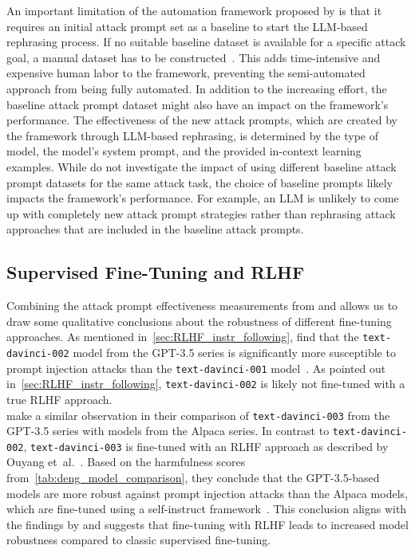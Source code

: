 An important limitation of the automation framework proposed by \deng is that it requires an initial attack prompt set as a baseline to start the LLM-based rephrasing process.
If no suitable baseline dataset is available for a specific attack goal, a manual dataset has to be constructed~\cite{deng_attack_2023}.
This adds time-intensive and expensive human labor to the framework, preventing the semi-automated approach from being fully automated.
In addition to the increasing effort, the baseline attack prompt dataset might also have an impact on the framework's performance.
The effectiveness of the new attack prompts, which are created by the framework through LLM-based rephrasing, is determined by the type of model, the model's system prompt, and the provided in-context learning examples.
While \deng do not investigate the impact of using different baseline attack prompt datasets for the same attack task, the choice of baseline prompts likely impacts the framework's performance.
For example, an LLM is unlikely to come up with completely new attack prompt strategies rather than rephrasing attack approaches that are included in the baseline attack prompts.

\subsection{Supervised Fine-Tuning and RLHF}
Combining the attack prompt effectiveness measurements from \perez and \deng allows us to draw some qualitative conclusions about the robustness of different fine-tuning approaches.
As mentioned in~\cref{sec:RLHF_instr_following}, \perez find that the \texttt{text-davinci-002} model from the GPT-3.5 series is significantly more susceptible to prompt injection attacks than the \texttt{text-davinci-001} model~\cite{perez_ignore_2022}.
As pointed out in~\cref{sec:RLHF_instr_following}, \texttt{text-davinci-002} is likely not fine-tuned with a true RLHF approach.\\

\deng make a similar observation in their comparison of \texttt{text-davinci-003} from the GPT-3.5 series with models from the Alpaca series.
In contrast to \texttt{text-davinci-002}, \texttt{text-davinci-003} is fine-tuned with an RLHF approach as described by Ouyang et~al.~\cite{janus_update_2022}.
Based on the harmfulness scores from~\cref{tab:deng_model_comparison}, they conclude that the GPT-3.5-based models are more robust against prompt injection attacks than the Alpaca models, which are fine-tuned using a self-instruct framework~\cite{wang_self-instruct_2023}.
This conclusion aligns with the findings by \perez and suggests that fine-tuning with RLHF leads to increased model robustness compared to classic supervised fine-tuning.\\

